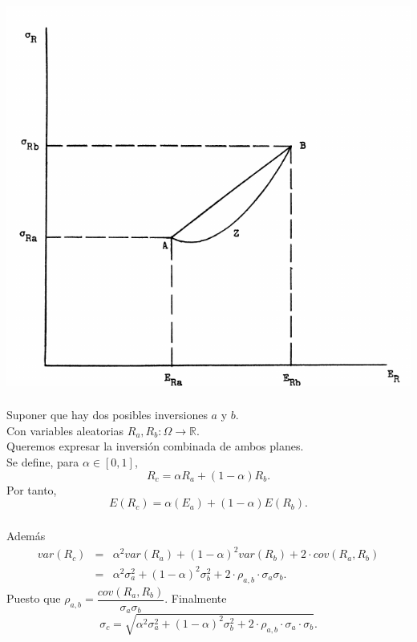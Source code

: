 \documentclass{beamer}
\begin{document}
\begin{frame}[t,fragile]
	\frametitle{\subsecname}
	\includegraphics[width= 0.75 \linewidth, page = 1]{IMAGES/1/3}
\end{frame}

\begin{frame}[t,fragile]
	\frametitle{\subsecname}
	\begin{block}{\centering }
	Suponer que hay dos posibles inversiones \(a\) y \(b\). \\ 
	Con variables aleatorias \(R_a,R_b: \Omega \longrightarrow \mathbb{R}\). \\ 
	Queremos expresar la inversión combinada de ambos planes. \\ 
	Se define, para \(\alpha \in [0,1]\),
	\[
		R_c = \alpha R_a + (1- \alpha) R_b.
	\]
	Por tanto,
	\[
		E(R_c) = \alpha (E_a) + (1- \alpha) E(R_b).
	\]
	\end{block}
\end{frame}

\begin{frame}[t,fragile]
	\frametitle{\subsecname}
	\begin{block}{\centering }
	Además
	\[
		\begin{array}{rcl}
			var(R_c) & = & \alpha ^2 var(R_a) + (1- \alpha) ^2 var(R_b) +
			2 \cdot cov(R_a,R_b) \\[2mm]
			& = & \alpha ^2 \sigma ^ 2_a + (1- \alpha) ^2 \sigma ^2_b +
			2 \cdot \rho _{a,b} \cdot \sigma _a \sigma _b.
		\end{array}
	\]
	Puesto que \(\rho _{a,b} = \dfrac{cov(R_a,R_b)}{\sigma _a \sigma _b}\).
	Finalmente
	\[
		\sigma _c = \sqrt{\alpha ^ 2 \sigma ^ 2_a + (1- \alpha) ^ 2 \sigma ^ 2_b
		 + 2 \cdot \rho _{a,b} \cdot \sigma _a \cdot \sigma _b}.
	\]
	\end{block}
\end{frame}
\end{document}
